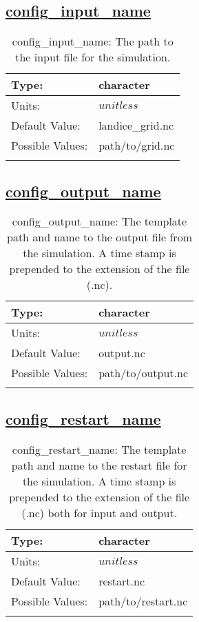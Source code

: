\subsection[config\_input\_name]{\hyperref[sec:nm_tab_io]{config\_input\_name}}
\label{subsec:nm_sec_config_input_name}
\begin{center}
\begin{longtable}{| p{2.0in} | p{4.0in} |}
    \hline
    Type: & character \\
    \hline
    Units: & $unitless$ \\
    \hline
    Default Value: & landice\_grid.nc \\
    \hline
    Possible Values: & path/to/grid.nc \\
    \hline
    \caption{config\_input\_name: The path to the input file for the simulation.}
\end{longtable}
\end{center}
\subsection[config\_output\_name]{\hyperref[sec:nm_tab_io]{config\_output\_name}}
\label{subsec:nm_sec_config_output_name}
\begin{center}
\begin{longtable}{| p{2.0in} | p{4.0in} |}
    \hline
    Type: & character \\
    \hline
    Units: & $unitless$ \\
    \hline
    Default Value: & output.nc \\
    \hline
    Possible Values: & path/to/output.nc \\
    \hline
    \caption{config\_output\_name: The template path and name to the output file from the simulation. A time stamp is prepended to the extension of the file (.nc).}
\end{longtable}
\end{center}
\subsection[config\_restart\_name]{\hyperref[sec:nm_tab_io]{config\_restart\_name}}
\label{subsec:nm_sec_config_restart_name}
\begin{center}
\begin{longtable}{| p{2.0in} | p{4.0in} |}
    \hline
    Type: & character \\
    \hline
    Units: & $unitless$ \\
    \hline
    Default Value: & restart.nc \\
    \hline
    Possible Values: & path/to/restart.nc \\
    \hline
    \caption{config\_restart\_name: The template path and name to the restart file for the simulation. A time stamp is prepended to the extension of the file (.nc) both for input and output.}
\end{longtable}
\end{center}
